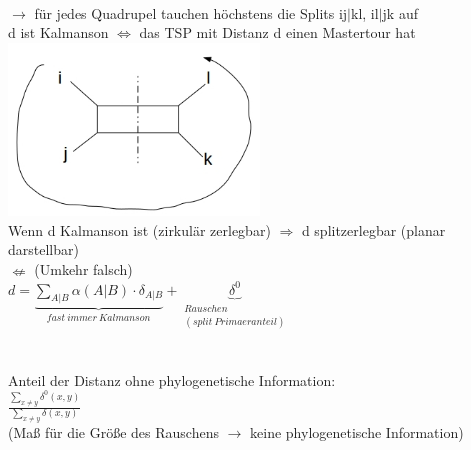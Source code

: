 \\
$\rightarrow$ für jedes Quadrupel tauchen höchstens die Splits ij$|$kl, il$|$jk auf\\
d ist Kalmanson $\Leftrightarrow$ das TSP mit Distanz d einen Mastertour hat\\
\includegraphics[width=0.5\textwidth]{lectures/161216/pix/7.jpg}\\
Wenn d Kalmanson ist (zirkulär zerlegbar) $\Rightarrow$ d splitzerlegbar (planar darstellbar)\\
$\nLeftarrow$ (Umkehr falsch)\\

$d=\underbrace{\displaystyle\sum_{A|B}\alpha(A|B) \cdot \delta_{A|B}}_{fast\ immer\ Kalmanson} + \underbrace{\delta^0}_{\substack{Rauschen \\ (split\ Primaeranteil)}}$\\\\\\
Anteil der Distanz ohne phylogenetische Information:\\
$\frac{\displaystyle\sum_{x\neq y} \delta^0(x,y)}{\displaystyle\sum_{x\neq y} \delta(x,y)}$\\
(Maß für die Größe des Rauschens $\rightarrow$ keine phylogenetische Information)